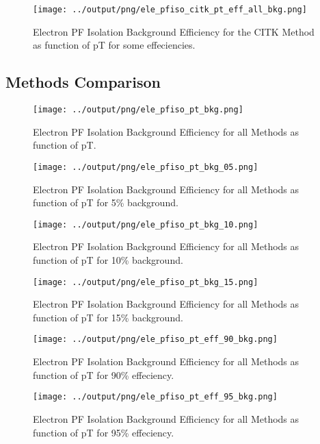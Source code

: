 \documentclass[11pt]{book}
\begin{document}
\begin{figure}[htb]
\centering
\texttt{[image: ../output/png/ele\_pfiso\_citk\_pt\_eff\_all\_bkg.png]}
\caption{Electron PF Isolation Background Efficiency for the CITK Method as function of pT for some effeciencies.}
\label{fig:ele_pfiso_pt_eff_citk_eff_all_bkg}
\end{figure}
\clearpage

\subsection{Methods Comparison}
\begin{figure}[htb]
\centering
\texttt{[image: ../output/png/ele\_pfiso\_pt\_bkg.png]}
\caption{Electron PF Isolation Background Efficiency for all Methods as function of pT.}
\label{fig:ele_pfiso_pt_bkg}
\end{figure}

\begin{figure}[htb]
\centering
\texttt{[image: ../output/png/ele\_pfiso\_pt\_bkg\_05.png]}
\caption{Electron PF Isolation Background Efficiency for all Methods as function of pT for 5\% background.}
\label{fig:ele_pfiso_pt_bkg_05}
\end{figure}

\begin{figure}[htb]
\centering
\texttt{[image: ../output/png/ele\_pfiso\_pt\_bkg\_10.png]}
\caption{Electron PF Isolation Background Efficiency for all Methods as function of pT for 10\% background.}
\label{fig:ele_pfiso_pt_bkg_10}
\end{figure}

\begin{figure}[htb]
\centering
\texttt{[image: ../output/png/ele\_pfiso\_pt\_bkg\_15.png]}
\caption{Electron PF Isolation Background Efficiency for all Methods as function of pT for 15\% background.}
\label{fig:ele_pfiso_pt_bkg_15}
\end{figure}

\begin{figure}[htb]
\centering
\texttt{[image: ../output/png/ele\_pfiso\_pt\_eff\_90\_bkg.png]}
\caption{Electron PF Isolation Background Efficiency for all Methods as function of pT for 90\% effeciency.}
\label{fig:ele_pfiso_pt_eff_90_bkg}
\end{figure}

\begin{figure}[htb]
\centering
\texttt{[image: ../output/png/ele\_pfiso\_pt\_eff\_95\_bkg.png]}
\caption{Electron PF Isolation Background Efficiency for all Methods as function of pT for 95\% effeciency.}
\label{fig:ele_pfiso_pt_eff_95_bkg}
\end{figure}
\end{document}
